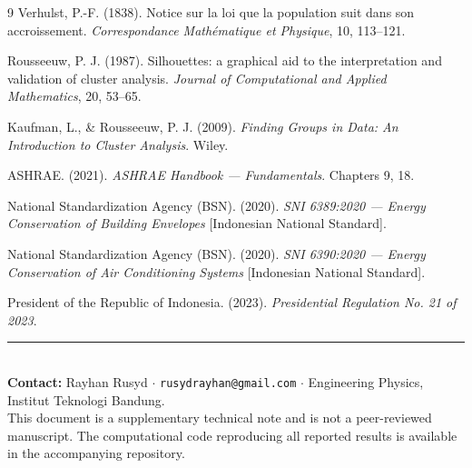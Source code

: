 \documentclass[11pt,a4paper]{article}
\begin{document}
\begin{thebibliography}{9}
Verhulst, P.-F. (1838).
Notice sur la loi que la population suit dans son accroissement.
\emph{Correspondance Mathématique et Physique}, 10, 113--121.

Rousseeuw, P. J. (1987).
Silhouettes: a graphical aid to the interpretation and validation of cluster analysis.
\emph{Journal of Computational and Applied Mathematics}, 20, 53--65.

Kaufman, L., \& Rousseeuw, P. J. (2009).
\emph{Finding Groups in Data: An Introduction to Cluster Analysis}. Wiley.

ASHRAE. (2021). \emph{ASHRAE Handbook --- Fundamentals}. Chapters 9, 18.

National Standardization Agency (BSN). (2020). \emph{SNI 6389:2020 --- Energy Conservation of Building Envelopes} [Indonesian National Standard].

National Standardization Agency (BSN). (2020). \emph{SNI 6390:2020 --- Energy Conservation of Air Conditioning Systems} [Indonesian National Standard].

President of the Republic of Indonesia. (2023). \emph{Presidential Regulation No. 21 of 2023}.
\end{thebibliography}

\vfill
\noindent\rule{\textwidth}{0.4pt}\\[4pt]
\footnotesize
\textbf{Contact:} Rayhan Rusyd $\cdot$ \texttt{rusydrayhan@gmail.com} $\cdot$ Engineering Physics, Institut Teknologi Bandung.\\
This document is a supplementary technical note and is not a peer-reviewed manuscript. The computational code reproducing all reported results is available in the accompanying repository.
\end{document}

